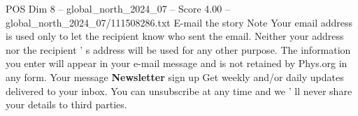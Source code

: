 \begin{textsample}{POS Dim 8 – global\_north\_2024\_07 – Score 4.00 – global\_north\_2024\_07/111508286.txt}
E-mail the story Note Your email address is used only to let the recipient know who sent the email.
Neither your address nor the recipient ' s address will be used for any other purpose.
The information you enter will appear in your e-mail message and is not retained by Phys.org in any form.
Your message \textbf{Newsletter} sign up Get weekly and/or daily updates delivered to your inbox.
You can unsubscribe at any time and we ' ll never share your details to third parties.

\end{textsample}
